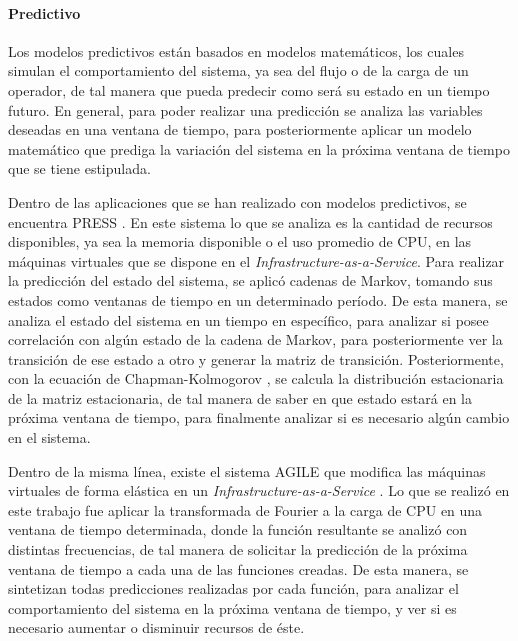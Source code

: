 \paragraph{Predictivo}


Los modelos predictivos están basados en modelos matemáticos, los cuales simulan el comportamiento del sistema, ya sea del flujo o de la carga de un operador, de tal manera que pueda predecir como será su estado en un tiempo futuro. En general, para poder realizar una predicción se analiza las variables deseadas en una ventana de tiempo, para posteriormente aplicar un modelo matemático que prediga la variación del sistema en la próxima ventana de tiempo que se tiene estipulada.

Dentro de las aplicaciones que se han realizado con modelos predictivos, se encuentra PRESS \citep{GongGW10}. En este sistema lo que se analiza es la cantidad de recursos disponibles, ya sea la memoria disponible o el uso promedio de CPU, en las máquinas virtuales que se dispone en el \textit{Infrastructure-as-a-Service}. Para realizar la predicción del estado del sistema, se aplicó cadenas de Markov, tomando sus estados como ventanas de tiempo en un determinado período. De esta manera, se analiza el estado del sistema en un tiempo en específico, para analizar si posee correlación con algún estado de la cadena de Markov, para posteriormente ver la transición de ese estado a otro y generar la matriz de transición. Posteriormente, con la ecuación de Chapman-Kolmogorov \citep{Papoulis1984}, se calcula la distribución estacionaria de la matriz estacionaria, de tal manera de saber en que estado estará en la próxima ventana de tiempo, para finalmente analizar si es necesario algún cambio en el sistema.

Dentro de la misma línea, existe el sistema AGILE que modifica las máquinas virtuales de forma elástica en un \textit{Infrastructure-as-a-Service} \citep{NguyenSGSW13}. Lo que se realizó en este trabajo fue aplicar la transformada de Fourier a la carga de CPU en una ventana de tiempo determinada, donde la función resultante se analizó con distintas frecuencias, de tal manera de solicitar la predicción de la próxima ventana de tiempo a cada una de las funciones creadas. De esta manera, se sintetizan todas predicciones realizadas por cada función, para analizar el comportamiento del sistema en la próxima ventana de tiempo, y ver si es necesario aumentar o disminuir recursos de éste.

